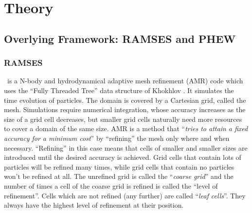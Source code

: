 \section{Theory}








\subsection{Overlying Framework: {\normalfont \scshape RAMSES} and {\normalfont \scshape PHEW}}






\subsubsection{{\normalfont \scshape RAMSES}}

\ramses\ is a N-body and hydrodynamical adaptive mesh refinement (AMR) code which uses the ``Fully Threaded Tree'' data structure of Khokhlov \parencite{FTT}. 
It simulates the time evolution of particles.
The domain is covered by a Cartesian grid, called the mesh.
Simulations require numerical integration, whose accuracy increases as the size of a grid cell decreases, but smaller grid cells naturally need more resources to cover a domain of the same size.
AMR is a method that ``\textit{tries to attain a fixed accuracy for a minimum cost}'' \parencite{AMR} by ``refining'' the mesh only where and when necessary.
``Refining'' in this case means that cells of smaller and smaller sizes are introduced until the desired accuracy is achieved.
Grid cells that contain lots of particles will be refined many times, while grid cells that contain no particles won't be refined at all.
The unrefined grid is called the ``\emph{coarse grid}'' and the number of times a cell of the coarse grid is refined is called the ``level of refinement''.
Cells which are not refined (any further) are called ``\emph{leaf cells}''.
They always have the highest level of refinement at their position.

